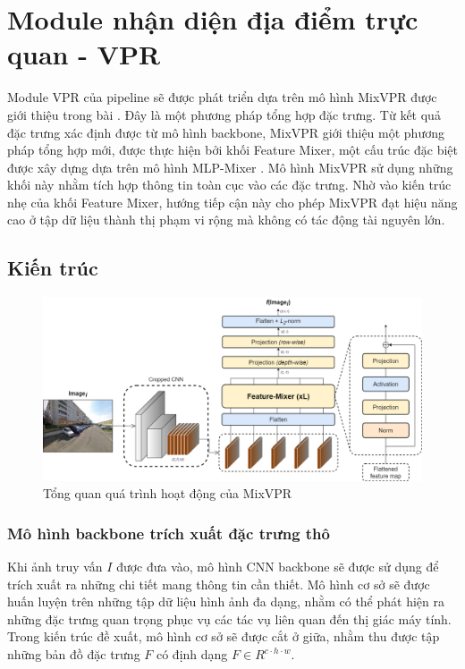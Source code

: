 \section{Module nhận diện địa điểm trực quan - VPR}
Module VPR của pipeline sẽ được phát triển dựa trên mô hình MixVPR được giới thiệu trong bài \cite{alibey2023mixvpr}. Đây là một phương pháp tổng hợp đặc trưng. Từ kết quả đặc trưng xác định được từ mô hình backbone, MixVPR giới thiệu một phương pháp tổng hợp mới, được thực hiện bởi khối Feature Mixer, một cấu trúc đặc biệt được xây dựng dựa trên mô hình MLP-Mixer \cite{tolstikhin2021mlpmixer}. Mô hình MixVPR sử dụng những khối này nhằm tích hợp thông tin toàn cục vào các đặc trưng. Nhờ vào kiến trúc nhẹ của khối Feature Mixer, hướng tiếp cận này cho phép MixVPR đạt hiệu năng cao ở tập dữ liệu thành thị phạm vi rộng mà không có tác động tài nguyên lớn.

\subsection{Kiến trúc}

\begin{figure}[H]
    \centering
    \includegraphics[width=\textwidth]{pics/Proposal/mixvpr.png}
    \caption{Tổng quan quá trình hoạt động của MixVPR \cite{alibey2023mixvpr}}
\end{figure}

\subsubsection{Mô hình backbone trích xuất đặc trưng thô}
Khi ảnh truy vấn $I$ được đưa vào, mô hình CNN backbone sẽ được sử dụng để trích xuất ra những chi tiết mang thông tin cần thiết. Mô hình cơ sở sẽ được huấn luyện trên những tập dữ liệu hình ảnh đa dạng, nhằm có thể phát hiện ra những đặc trưng quan trọng phục vụ các tác vụ liên quan đến thị giác máy tính. Trong kiến trúc đề xuất, mô hình cơ sở sẽ được cắt ở giữa, nhằm thu được tập những bản đồ đặc trưng $F$ có định dạng $F \in R^{c \cdot h \cdot w}$. 


